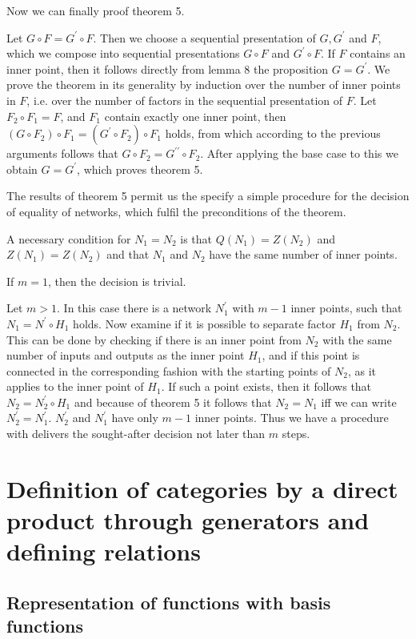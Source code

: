 \documentclass{article}
\begin{document}
Now we can finally proof theorem 5.

Let $G \circ F = G^{\prime} \circ F$. 
Then we choose a sequential presentation of $G, G^{\prime}$ and $F$, which we compose into sequential presentations $G \circ F$ and $G^{\prime} \circ F$. 
If $F$ contains an inner point, then it follows directly from lemma 8 the proposition $G = G^{\prime}$. 
We prove the theorem in its generality by induction over the number of inner points in $F$, 
i.e. over the number of factors in the sequential presentation of $F$. Let $F_2 \circ F_1 = F$, 
and $F_1$ contain exactly one inner point, then $(G \circ F_2) \circ F_1 = (G^{\prime} \circ F_2) \circ F_1$ holds, 
from which according to the previous arguments follows that $G \circ F_2 = G^{\prime \prime} \circ F_2$. 
After applying the base case to this we obtain $G = G^{\prime}$, which proves theorem 5.

The results of theorem 5 permit us the specify a simple procedure for the decision of equality of networks,
which fulfil the preconditions of the theorem.

A necessary condition for $N_1 = N_2$ is that $Q(N_1) = Z(N_2)$ and $Z(N_1) = Z(N_2)$ and that $N_1$ and $N_2$ have the same number of inner points.

If $m = 1$, then the decision is trivial.

Let $m > 1$. In this case there is a network $N^{\prime}_1$ with $m - 1$ inner points,
such that $N_1 = N^{\prime} \circ H_1$ holds. Now examine if it is possible to separate factor $H_1$ from $N_2$. 
This can be done by checking if there is an inner point from $N_2$ with the same number of inputs and outputs as the inner point $H_1$,
and if this point is connected in the corresponding fashion with the starting points of $N_2$,
as it applies to the inner point of $H_1$.
If such a point exists, then it follows that $N_2 = N^{\prime}_2 \circ H_1$ and because of theorem 5 it follows that $N_2 = N_1$ iff we can write $N^{\prime}_2 = N^{\prime}_1$.
$N^{\prime}_2$ and $N^{\prime}_1$ have only $m - 1$ inner points. 
Thus we have a procedure with delivers the sought-after decision not later than $m$ steps.

\section{Definition of categories by a direct product through generators and defining relations}
\subsection{Representation of functions with basis functions}
\label{basis-function-representation}
\end{document}
